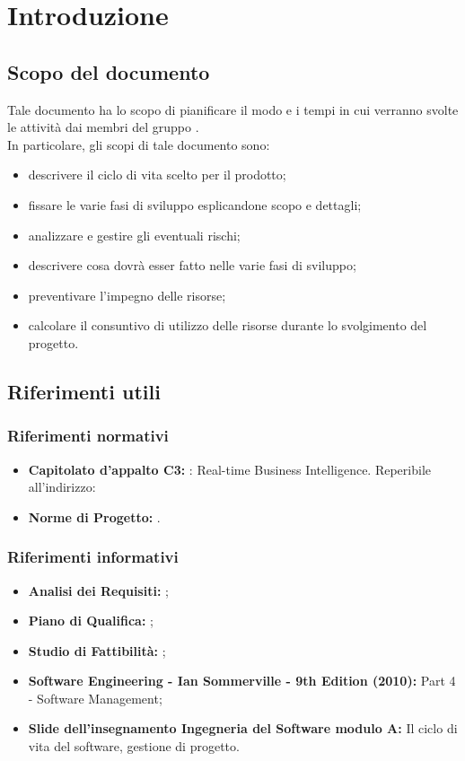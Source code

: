 \section{Introduzione}

	\subsection{Scopo del documento}
		Tale documento ha lo scopo di pianificare il modo e i tempi in cui verranno svolte le attività dai membri del gruppo \groupname{}.\\
		In particolare, gli scopi di tale documento sono:
		\begin{itemize}
			\item descrivere il ciclo di vita scelto per il prodotto;
			\item fissare le varie fasi di sviluppo esplicandone scopo e dettagli;
			\item analizzare e gestire gli eventuali rischi;
			\item descrivere cosa dovrà esser fatto nelle varie fasi di sviluppo;
			\item preventivare l'impegno delle risorse;
			\item calcolare il consuntivo di utilizzo delle risorse durante lo svolgimento del progetto.
		\end{itemize}
	
		

	\subsection{Riferimenti utili}
		\subsubsection{Riferimenti normativi}
			\begin{itemize}
				\item\textbf{Capitolato d'appalto C3:} \projectname{}: Real-time Business Intelligence. Reperibile all'indirizzo: 
				\item\textbf{Norme di Progetto:} .
			\end{itemize}
		\subsubsection{Riferimenti informativi}
			\begin{itemize}
				\item \textbf{Analisi dei Requisiti:} ;
				\item \textbf{Piano di Qualifica:} ;
				\item \textbf{Studio di Fattibilità:} ;
				\item \textbf{Software Engineering - Ian Sommerville - 9th Edition (2010):} Part 4 - Software Management;
				\item \textbf{Slide dell’insegnamento Ingegneria del Software modulo A:} Il ciclo di vita del software, gestione di progetto.
			\end{itemize}